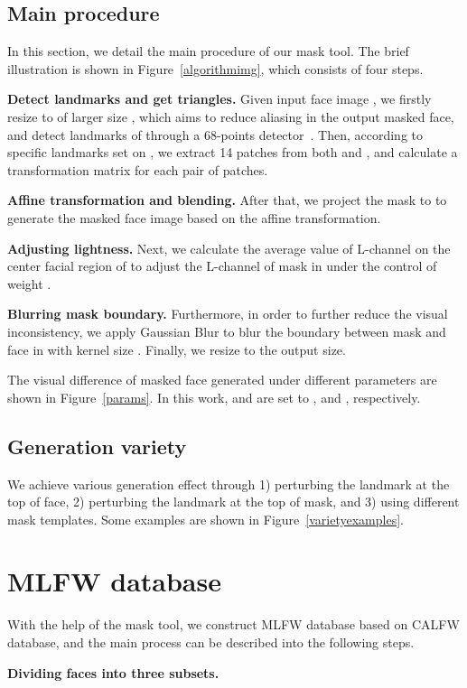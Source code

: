 \documentclass[final]{cvpr}
\begin{document}
\subsection{Main procedure}
In this section, we detail the main procedure of our mask tool. The brief illustration is shown in Figure~\ref{algorithmimg}, which consists of four steps.

\textbf{Detect landmarks and get triangles.} Given input face image , we firstly resize  to  of larger size , which aims to reduce aliasing in the output masked face, and detect landmarks of  through a 68-points detector~\cite{bulat2017far}.
Then, according to specific landmarks set on , we extract 14 patches from both  and , and calculate a transformation matrix for each pair of patches.

\textbf{Affine transformation and blending.} After that, we project the mask  to  to generate the masked face image  based on the affine transformation.

\textbf{Adjusting lightness.} Next, we calculate the average value of L-channel on the center facial region of  to adjust the L-channel of mask in  under the control of weight .

\textbf{Blurring mask boundary.} Furthermore, in order to further reduce the visual inconsistency, we apply Gaussian Blur to blur the boundary between mask and face in  with kernel size .
Finally, we resize  to the output size.

The visual difference of masked face generated under different parameters are shown in Figure~\ref{params}. In this work,  and  are set to ,  and , respectively.

\subsection{Generation variety}
We achieve various generation effect through 1) perturbing the landmark at the top of face, 2) perturbing the landmark at the top of mask, and 3) using different mask templates.
Some examples are shown in Figure~\ref{varietyexamples}.


\section{MLFW database}

With the help of the mask tool, we construct MLFW database based on CALFW database, and the main process can be described into the following steps.


\textbf{Dividing faces into three subsets.}
\end{document}
